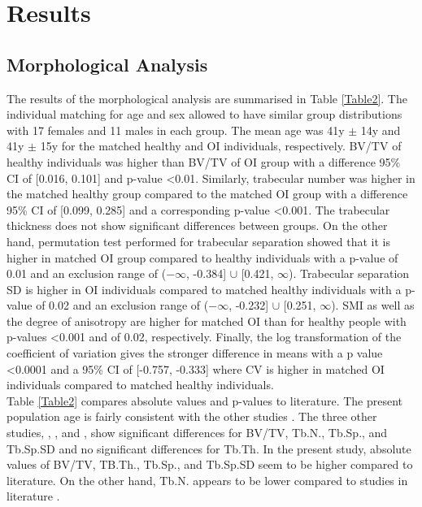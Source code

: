 \documentclass[a4paper,fleqn]{DC_ArtStyle}
\begin{document}
	
	\section{Results}
	\subsection{Morphological Analysis}
	The results of the morphological analysis are summarised in Table \ref{Table2}. The individual matching for age and sex allowed to have similar group distributions with 17 females and 11 males in each group. The mean age was 41y $\pm$ 14y and 41y $\pm$ 15y for the mat\-ched healthy and OI individuals, respectively. BV/TV of healthy individuals was higher than BV/TV of OI group with a difference 95\% CI of [0.016, 0.101] and p-value <0.01. Similarly, trabecular number was higher in the matched healthy group compared to the matched OI group with a difference 95\% CI of [0.099, 0.285] and a corresponding p-value <0.001. The trabecular thickness does not show significant differences between groups. On the other hand, permutation test performed for trabecular separation showed that it is higher in matched OI group compared to healthy individuals with a p-value of 0.01 and an exclusion range of ($-\infty$, -0.384] $\cup$ [0.421, $\infty$). Trabecular separation SD is higher in OI individuals compared to matched healthy individuals with a p-value of 0.02 and an exclusion range of ($-\infty$, -0.232] $\cup$ [0.251, $\infty$). SMI as well as the degree of anisotropy are higher for matched OI than for healthy people with p-values <0.001 and of 0.02, respectively. Finally, the log transformation of the coefficient of variation gives the stronger difference in means with a p value <0.0001 and a 95\% CI of [-0.757, -0.333] where CV is higher in matched OI individuals compared to matched healthy individuals.\\
	
	Table \ref{Table2} compares absolute values and p-values to literature. The present population age is fairly consistent with the other studies \cite{Folkestad2012,Kocijan2015,Rolvien2018}. The three other studies,  \citeauthor{Folkestad2012}\cite{Folkestad2012}, \citeauthor{Kocijan2015}\cite{Kocijan2015}, and \citeauthor{Rolvien2018}\cite{Rolvien2018}, show significant differences for BV/TV, Tb.N., Tb.Sp., and Tb.Sp.SD and no significant differences for Tb.Th. In the present study, absolute values of BV/TV, TB.Th., Tb.Sp., and Tb.Sp.SD seem to be higher compared to literature. On the other hand, Tb.N. appears to be lower compared to studies in literature \cite{Folkestad2012,Kocijan2015,Rolvien2018}.
	
\end{document}

